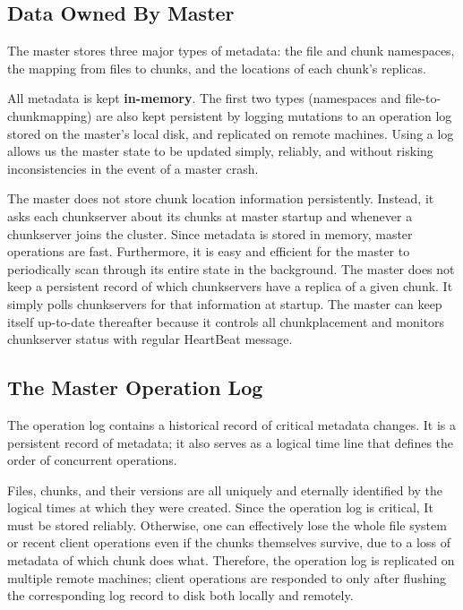 \documentclass{article}
\begin{document}
\subsection{Data Owned By Master}
The master stores three major types of metadata: the file and chunk
namespaces, the mapping from files to chunks, and the locations of each chunk’s
replicas.

All metadata is kept \textbf{in-memory}. The first two types (namespaces
and file-to-chunkmapping) are also kept persistent by logging mutations to an
operation log stored on the master’s local disk, and replicated on remote
machines. Using a log allows us the master state to be updated simply, reliably,
and without risking inconsistencies in the event of a master crash. 

The master does not store chunk location information persistently. Instead, it
asks each chunkserver about its chunks at master startup and whenever a
chunkserver joins the cluster.  Since metadata is stored in memory, master
operations are fast. Furthermore, it is easy and efficient for the master to
periodically scan through its entire state in the background. The master does
not keep a persistent record of which chunkservers have a replica of a given
chunk. It simply polls chunkservers for that information at startup. The master
can keep itself up-to-date thereafter because it controls all chunkplacement
and monitors chunkserver status with regular HeartBeat message.

\subsection{The Master Operation Log}

The operation log contains a historical record of critical metadata changes.
It is a persistent record of metadata; it also serves as a logical time line 
that defines the order of concurrent operations. 

Files, chunks, and their versions are all uniquely and eternally identified by
the logical times at which they were created.  Since the operation log is
critical, It must be stored reliably. Otherwise, one can  effectively lose the
whole file system or recent client operations even if the chunks themselves
survive, due to a loss of metadata of which chunk does what.  Therefore, the
operation log is replicated on multiple remote machines; client operations are
responded to only after flushing the corresponding log record to disk both
locally and remotely.
\end{document}
